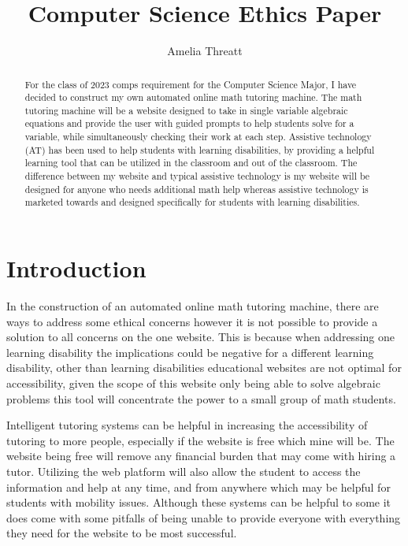 \documentclass[10pt,twocolumn]{article}
\title{Computer Science Ethics Paper}
\author{Amelia Threatt}
\affiliation{Occidental College}
\begin{document}
\maketitle

\begin{abstract}
For the class of 2023 comps requirement for the Computer Science Major, I have decided to construct my own automated online math tutoring machine. The math tutoring machine will be a website designed to take in single variable algebraic equations and provide the user with guided prompts to help students solve for a variable, while simultaneously checking their work at each step. Assistive technology (AT) has been used to help students with learning disabilities, by providing a helpful learning tool that can be utilized in the classroom and out of the classroom. The difference between my website and typical assistive technology is my website will be designed for anyone who needs additional math help whereas assistive technology is marketed towards and designed specifically for students with learning disabilities. 
\end{abstract}

\section{Introduction}
 In the construction of an automated online math tutoring machine, there are ways to address some ethical concerns however it is not possible to provide a solution to all concerns on the one website. This is because when addressing one learning disability the implications could be negative for a different learning disability, other than learning disabilities educational websites are not optimal for accessibility, given the scope of this website only being able to solve algebraic problems this tool will concentrate the power to a small group of math students. 

Intelligent tutoring systems can be helpful in increasing the accessibility of tutoring to more people, especially if the website is free which mine will be. The website being free will remove any financial burden that may come with hiring a tutor. Utilizing the web platform will also allow the student to access the information and help at any time, and from anywhere which may be helpful for students with mobility issues. Although these systems can be helpful to some it does come with some pitfalls of being unable to provide everyone with everything they need for the website to be most successful. 
\end{document}
